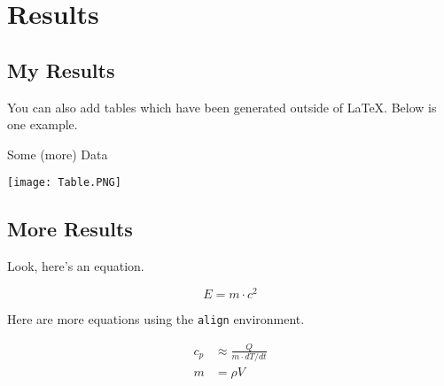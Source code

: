 \chapter{Results}
\label{ch:Results}

\section{My Results}

You can also add tables which have been generated outside of \LaTeX. Below is one example.

\begin{table}[h]
\centering
\caption{Some (more) Data}
\label{tab:more data}
\texttt{[image: Table.PNG]}
\end{table}

\section{More Results}

Look, here's an equation.

\begin{equation}
    E = m \cdot c^2
\end{equation}

Here are more equations using the \texttt{align} environment.

\begin{align}
    c_p &\approx \frac{Q}{m \cdot dT/dt} \\
    m &= \rho V
\end{align}

